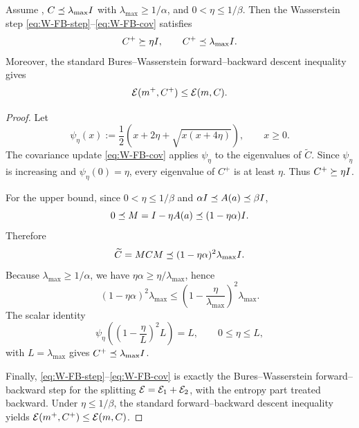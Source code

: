 \begin{lemma}
\label{lem:one-step-W-bootstrap}
Assume , $C\preceq\lambda_{\max}I$ with
$\lambda_{\max}\ge1/\alpha$, and $0<\eta\le1/\beta$. Then the Wasserstein step
\eqref{eq:W-FB-step}--\eqref{eq:W-FB-cov} satisfies
\[
    C^+\succeq\eta I,
    \qquad
    C^+\preceq\lambda_{\max}I.
\]
Moreover, the standard Bures--Wasserstein forward--backward descent inequality gives
\[
    \mathcal{E}(m^+,C^+)\le\mathcal{E}(m,C).
\]
\end{lemma}

\begin{proof}
Let
\[
    \psi_\eta(x)
    :=
    \frac12\left(x+2\eta+\sqrt{x(x+4\eta)}\right),
    \qquad x\ge0.
\]
The covariance update \eqref{eq:W-FB-cov} applies $\psi_\eta$ to the eigenvalues of
$\widetilde C$. Since $\psi_\eta$ is increasing and $\psi_\eta(0)=\eta$, every eigenvalue of
$C^+$ is at least $\eta$. Thus $C^+\succeq\eta I$.

For the upper bound, since $0<\eta\le1/\beta$ and $\alpha I\preceq A(a)\preceq\beta I$,
\[
    0\preceq M=I-\eta A(a)\preceq(1-\eta\alpha)I.
\]
Therefore
\[
    \widetilde C=MCM\preceq (1-\eta\alpha)^2\lambda_{\max}I.
\]
Because $\lambda_{\max}\ge1/\alpha$, we have $\eta\alpha\ge\eta/\lambda_{\max}$, hence
\[
    (1-\eta\alpha)^2\lambda_{\max}
    \le
    \left(1-\frac\eta{\lambda_{\max}}\right)^2\lambda_{\max}.
\]
The scalar identity
\[
    \psi_\eta\!\left(\left(1-\frac\eta L\right)^2L\right)=L,
    \qquad 0\le\eta\le L,
\]
with $L=\lambda_{\max}$ gives $C^+\preceq\lambda_{\max}I$.

Finally, \eqref{eq:W-FB-step}--\eqref{eq:W-FB-cov} is exactly the Bures--Wasserstein
forward--backward step for the splitting $\mathcal{E}=\mathcal{E}_1+\mathcal{E}_2$, with the entropy part treated
backward. Under $\eta\le1/\beta$, the standard forward--backward descent inequality yields
$\mathcal{E}(m^+,C^+)\le\mathcal{E}(m,C)$.
\end{proof}

